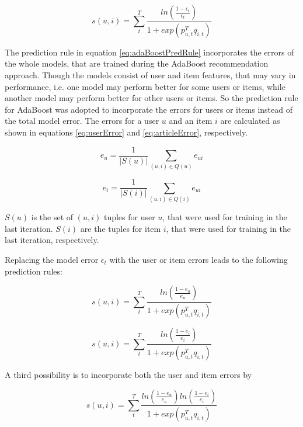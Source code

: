 \documentclass[10pt]{reportMaster}
\begin{document}
\begin{equation}
\label{eq:adaBoostPredRule}
s(u,i) = \sum_t^T{\frac{ln(\frac{1 - \epsilon_t}{\epsilon_t})}{1 + exp(p_{u,t}^Tq_{i,t})}}
\end{equation}

The prediction rule in equation \ref{eq:adaBoostPredRule} incorporates the errors of the whole models, that are trained during the AdaBoost recommendation approach.
Though the models consist of user and item features, that may vary in performance, i.e. one model may perform better for some users or items, while another model may perform better for other users or items.
So the prediction rule for AdaBoost was adopted to incorporate the errors for users or items instead of the total model error.
The errors for a user $u$ and an item $i$ are calculated as shown in equations \ref{eq:userError} and \ref{eq:articleError}, respectively.

\begin{equation}
	\label{eq:userError}
	e_{u} = \frac{1}{|S(u)|} \sum_{(u,i) \in Q(u)}{e_{ui}}
\end{equation}

\begin{equation}
	\label{eq:articleError}
	e_{i} = \frac{1}{|S(i)|} \sum_{(u,i) \in Q(i)}{e_{ui}}
\end{equation}

$S(u)$ is the set of $(u,i)$ tuples for user $u$, that were used for training in the last iteration.
$S(i)$ are the tuples for item $i$, that were used for training in the last iteration, respectively.

Replacing the model error $\epsilon_t$ with the user or item errors leads to the following prediction rules:

\begin{equation}
\label{eq:userErrorPrediction}
	s(u,i) = \sum_t^T{\frac{ln(\frac{1 - e_u}{e_u})}{1 + exp(p_{u,t}^Tq_{i,t})}}
\end{equation}

\begin{equation}
\label{eq:articleErrorPrediction}
s(u,i) = \sum_t^T{\frac{ln(\frac{1 - e_i}{e_i})}{1 + exp(p_{u,t}^Tq_{i,t})}}
\end{equation}

A third possibility is to incorporate both the user and item errors by 

\begin{equation}
\label{eq:combinedErrorPrediction}
s(u,i) = \sum_t^T{\frac{ln(\frac{1 - e_u}{e_u})ln(\frac{1 - e_i}{e_i})}{1 + exp(p_{u,t}^Tq_{i,t})}}
\end{equation}
\end{document}
